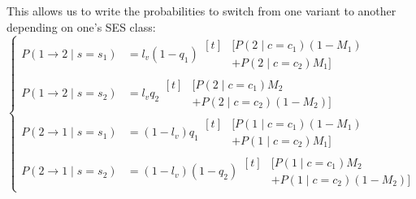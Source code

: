 \documentclass[../thesis.tex]{subfiles}
\begin{document}
This allows us to write the probabilities to switch from one variant to
another depending on one's \ac{SES} class:
\begin{equation}
  \left\{
  \begin{aligned}
      P(1 \rightarrow 2 \mid s = s_1)
          &= l_v (1 - q_1)
          \begin{aligned}[t]
            &[P(2 \mid c = c_1) (1 - M_1)
            \\
            &+ P(2 \mid c = c_2) M_1]
          \end{aligned}
      \\[1ex]
      P(1 \rightarrow 2 \mid s = s_2)
          &= l_v q_2
          \begin{aligned}[t]
              &[P(2 \mid c = c_1) M_2
              \\
              &+ P(2 \mid c = c_2)(1 - M_2)]
          \end{aligned}
      \\[1ex]
      P(2 \rightarrow 1 \mid s = s_1)
          &= (1 - l_v) q_1
          \begin{aligned}[t]
              &[P(1 \mid c = c_1) (1 - M_1)
              \\
              & + P(1 \mid c = c_2) M_1]
          \end{aligned}
      \\[1ex]
      P(2 \rightarrow 1 \mid s = s_2)
          &= (1 - l_v) (1 - q_2)
          \begin{aligned}[t]
              &[P(1 \mid c = c_1) M_2
              \\
              &+ P(1 \mid c = c_2) (1 - M_2)]
          \end{aligned}
  \end{aligned}
  \right.
\end{equation}
\end{document}
